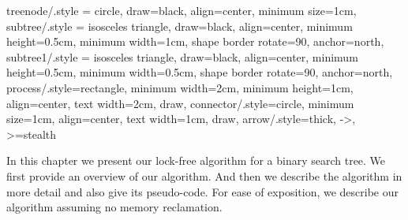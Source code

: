 \begin{limitscope}
\tikzset
{
    treenode/.style = {circle, draw=black, align=center, minimum size=1cm},
    subtree/.style  = {isosceles triangle, draw=black, align=center, minimum height=0.5cm, minimum width=1cm, shape border rotate=90, anchor=north},
    subtree1/.style  = {isosceles triangle, draw=black, align=center, minimum height=0.5cm, minimum width=0.5cm, shape border rotate=90, anchor=north},
    process/.style={rectangle, minimum width=2cm, minimum height=1cm, align=center, text width=2cm, draw},
    connector/.style={circle, minimum size=1cm, align=center, text width=1cm, draw},
    arrow/.style={thick, ->, >=stealth}
}
\newcommand{\terminalnode}{terminal node}
\newcommand{\targetnode}{target node}
\newcommand{\accesspath}{access-path}
\newcommand{\nullFlag}{null-flag}
\newcommand{\intentFlag}{intent-flag}
\newcommand{\deleteFlag}{delete-flag}
\newcommand{\promoteFlag}{promote-flag}
\newcommand{\anchornode}{anchor node}
\newcommand{\injection}{injection}
\newcommand{\discovery}{discovery}
\newcommand{\cleanup}{cleanup}

\newcommand{\Search}{\textsc{Search}}
\newcommand{\Insert}{\textsc{Insert}}
\newcommand{\Delete}{\textsc{Delete}}
\newcommand{\Seek}{\textsc{Seek}}
\newcommand{\FindSmallest}{\textsc{FindSmallest}}
\newcommand{\Inject}{\textsc{Inject}}
\newcommand{\FindAndMarkSuccessor}{\textsc{FindAndMarkSuccessor}}
\newcommand{\RemoveSuccessor}{\textsc{RemoveSuccessor}}
\newcommand{\Cleanup}{\textsc{Cleanup}}
\newcommand{\InitializeTypeAndUpdateMode}{\textsc{InitializeTypeAndUpdateMode}}
\newcommand{\UpdateMode}{\textsc{UpdateMode}}
\newcommand{\HelpTargetNode}{\textsc{HelpTargetNode}}
\newcommand{\HelpSuccessorNode}{\textsc{HelpSuccessorNode}}
\newcommand{\MarkChildEdge}{\textsc{MarkChildEdge}}
\newcommand{\remove}[1]{}


\newcommand{\snodeone}{\mathbb{R}}
\newcommand{\snodetwo}{\mathbb{S}}
\newcommand{\snodethree}{\mathbb{T}}
\newcommand{\skey}[1]{\infty_{#1}}


\newcommand{\myleft}{le\!f\!t}
\newcommand{\myright}{right}
\newcommand{\myparent}{parent}


In this chapter we present our lock-free algorithm for a binary search tree. We first provide an overview of our algorithm. And then we describe the algorithm in more detail and also give its pseudo-code. For ease of exposition, we describe our algorithm assuming no memory reclamation.


\end{limitscope}
